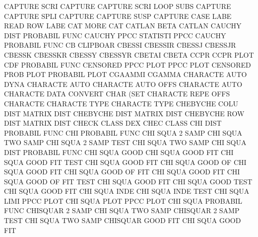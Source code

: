 CAPTURE  SCRI                           CAPTURE
CAPTURE  SCRI LOOP SUBS                 CAPTURE
CAPTURE  SPLI                           CAPTURE
CAPTURE  SUSP                           CAPTURE
CASE     LABE                           READ     ROW  LABE
CAT      MORE                           CAT
CATLAN   BETA                           CATLAN
CAUCHY   DIST                           PROBABIL FUNC
CAUCHY   PPCC                           STATISTI PPCC
CAUCHY                                  PROBABIL FUNC
CB                                      CLIPBOAR
CBESSI                                  CBESSIR
CBESSJ                                  CBESSJR
CBESSK                                  CBESSKR
CBESSY                                  CBESSYR
CBETAI                                  CBETA
CCPR                                    CCPR     PLOT
CDF                                     PROBABIL FUNC
CENSORED PPCC PLOT                      PPCC     PLOT
CENSORED PROB PLOT                      PROBABIL PLOT
CGAAMMI                                 CGAMMA
CHARACTE AUTO DYNA                      CHARACTE AUTO
CHARACTE AUTO OFFS                      CHARACTE AUTO
CHARACTE DATA                           CONVERT  CHAR (SET
CHARACTE REPE OFFS                      CHARACTE
CHARACTE TYPE                           CHARACTE TYPE
CHEBYCHE COLU DIST                      MATRIX   DIST
CHEBYCHE DIST                           MATRIX   DIST
CHEBYCHE ROW  DIST                      MATRIX   DIST
CHECK    CLASS                          DEX      CHEC CLASS
CHI      DIST                           PROBABIL FUNC
CHI                                     PROBABIL FUNC
CHI      SQUA 2    SAMP                 CHI      SQUA TWO  SAMP
CHI      SQUA 2    SAMP TEST            CHI      SQUA TWO  SAMP
CHI      SQUA DIST                      PROBABIL FUNC
CHI      SQUA GOOD                      CHI      SQUA GOOD FIT
CHI      SQUA GOOD FIT  TEST            CHI      SQUA GOOD FIT
CHI      SQUA GOOD OF                   CHI      SQUA GOOD FIT
CHI      SQUA GOOD OF   FIT             CHI      SQUA GOOD FIT
CHI      SQUA GOOD OF   FIT  TEST       CHI      SQUA GOOD FIT
CHI      SQUA GOOD TEST                 CHI      SQUA GOOD FIT
CHI      SQUA INDE                      CHI      SQUA INDE TEST
CHI      SQUA LIMI                      PPCC     PLOT
CHI      SQUA PLOT                      PPCC     PLOT
CHI      SQUA                           PROBABIL FUNC
CHISQUAR 2    SAMP                      CHI      SQUA TWO  SAMP
CHISQUAR 2    SAMP TEST                 CHI      SQUA TWO  SAMP
CHISQUAR GOOD FIT                       CHI      SQUA GOOD FIT
